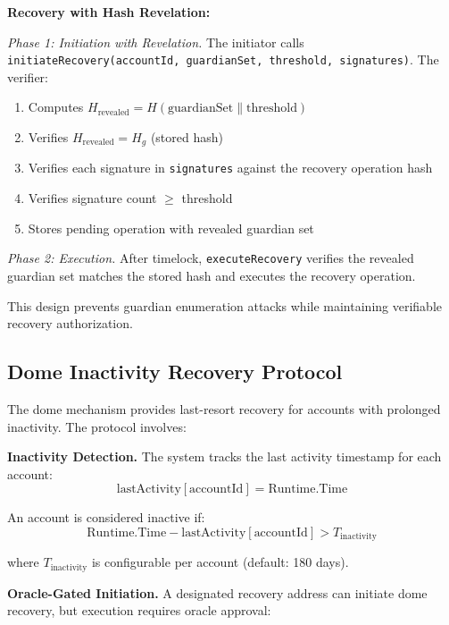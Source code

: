 \documentclass[10pt,twocolumn]{article}
\newcommand{\code}[1]{\texttt{\small #1}}
\begin{document}
\textbf{Recovery with Hash Revelation:}

\textit{Phase 1: Initiation with Revelation.} The initiator calls \code{initiateRecovery(accountId, guardianSet, threshold, signatures)}. The verifier:
\begin{enumerate}[leftmargin=*,topsep=2pt,itemsep=1pt]
\item Computes $H_{\text{revealed}} = H(\text{guardianSet} \| \text{threshold})$
\item Verifies $H_{\text{revealed}} = H_g$ (stored hash)
\item Verifies each signature in \code{signatures} against the recovery operation hash
\item Verifies signature count $\geq$ threshold
\item Stores pending operation with revealed guardian set
\end{enumerate}

\textit{Phase 2: Execution.} After timelock, \code{executeRecovery} verifies the revealed guardian set matches the stored hash and executes the recovery operation.

This design prevents guardian enumeration attacks while maintaining verifiable recovery authorization.



\subsection{Dome Inactivity Recovery Protocol}

The dome mechanism provides last-resort recovery for accounts with prolonged inactivity. The protocol involves:

\textbf{Inactivity Detection.} The system tracks the last activity timestamp for each account:
$$\text{lastActivity}[\text{accountId}] = \text{Runtime.Time}$$

An account is considered inactive if:
$$\text{Runtime.Time} - \text{lastActivity}[\text{accountId}] > T_{\text{inactivity}}$$

where $T_{\text{inactivity}}$ is configurable per account (default: 180 days).

\textbf{Oracle-Gated Initiation.} A designated recovery address can initiate dome recovery, but execution requires oracle approval:
\end{document}
